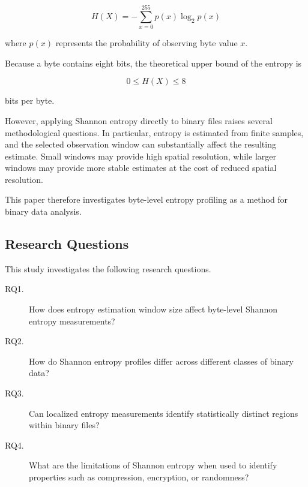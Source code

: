 \documentclass[10pt,letterpaper]{article}
\begin{document}
\begin{equation}
    H(X)
    = 
    -\sum_{x=0}^{255}
    p(x)\log_2 p(x)
\end{equation}

where $p(x)$ represents the probability of observing byte value $x$.

Because a byte contains eight bits, the theoretical upper bound of the entropy is

\begin{equation}
    0 \leq H(X) \leq 8
\end{equation}

bits per byte.

However, applying Shannon entropy directly to binary files raises several methodological questions. In particular, entropy is estimated from finite samples, and the selected observation window can substantially affect the resulting estimate. Small windows may provide high spatial resolution, while larger windows may provide more stable estimates at the cost of reduced spatial resolution.

This paper therefore investigates byte-level entropy profiling as a method for binary data analysis.


\subsection{Research Questions}

This study investigates the following research questions.

\begin{description}
    \item[RQ1.] 
    How does entropy estimation window size affect byte-level Shannon entropy measurements?
    
    \item[RQ2.]
    How do Shannon entropy profiles differ across different classes of binary data?

    \item[RQ3.]
    Can localized entropy measurements identify statistically distinct regions within binary files?

    \item[RQ4.]
    What are the limitations of Shannon entropy when used to identify properties such as compression, encryption, or randomness?
\end{description}

\end{document}
